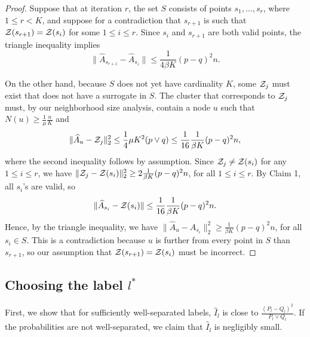 \documentclass{article}
\begin{document}
\begin{proof}
Suppose that at iteration $r$, the set $S$ consists of points $s_1, \dots, s_r$, where $1 \leq r < K$, and suppose for a contradiction that $s_{r+1}$ is such that ${\cal Z}(s_{r+1}) = {\cal Z}(s_i)$ for some $1 \leq i \leq r$. Since $s_i$ and $s_{r+1}$ are both valid points, the triangle inequality implies
$$\| \hat A_{s_{r+1}} - \hat A_{s_i} \| \leq \frac{1}{4 \beta K} (p - q)^2 n.$$

On the other hand, because $S$ does not yet have cardinality $K$, some ${\cal Z}_j$ must exist that does not have a surrogate in $S$. The cluster that corresponds to ${\cal Z}_j$ must, by our neighborhood size analysis, contain a node $u$ such that $N(u) \geq \frac{1}{\mu} \frac{n}{K}$ and
\[
\| \hat{A}_u - {\cal Z}_j \|_2^2 \leq \frac{1}{4} \mu K^2 (p \vee q)  \leq \frac{1}{16} \frac{1}{\beta K} (p-q)^2 n,
\]
where the second inequality follows by assumption. Since ${\cal Z}_j \neq {\cal Z}(s_i)$ for any $1 \leq i \leq r$, we have $\| {\cal Z}_j - {\cal Z}(s_i) \|_2^2 \geq 2 \frac{1}{\beta K} (p-q)^2 n$, for all $1 \leq i \leq r$. By Claim 1, all $s_i$'s are valid, so
$$\| \hat{A}_{s_i} - {\cal Z}(s_i) \| \leq \frac{1}{16} \frac{1}{\beta K} (p - q)^2 n.$$ 
Hence, by the triangle inequality, we have $\| \hat{A}_u - \hat{A}_{s_i} \|_2^2 \geq \frac{1}{\beta K} (p - q)^2 n$, for all $s_i \in S$. This is a contradiction because $u$ is further from every point in $S$ than $s_{r+1}$, so our assumption that ${\cal Z}(s_{r+1}) =  {\cal Z}(s_i)$ must be incorrect.
\end{proof}


\subsection{Choosing the label $l^*$}
\label{appendix: starry night}

First,  we show that for sufficiently well-separated labels, $\hat I_l$ is close to $\frac{( P_l -  Q_l)^2}{P_l \vee Q_l}$. If the probabilities are not well-separated, we claim that $\hat I_l$ is negligibly small.
\end{document}
